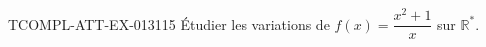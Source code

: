 \begin{exercice}{TCOMPL-ATT-EX-013}{1}{15}
Étudier les variations de $f(x) = \dfrac{x^2+1}{x}$ sur $\mathbb{R}^*$.

\end{exercice}
